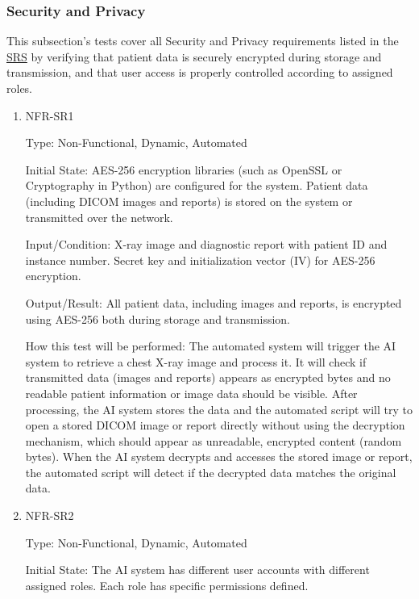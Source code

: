 \documentclass[12pt, titlepage]{article}
\begin{document}
\subsubsection{Security and Privacy}

This subsection's tests cover all Security and Privacy requirements listed in the \href{https://github.com/RezaJodeiri/CXR-Capstone/blob/main/docs/SRS/SRS.pdf}{SRS} \citep{SRS}
 by verifying that patient data is securely encrypted during storage and transmission, and that user access is properly controlled according to assigned roles.

\begin{enumerate}

\item{NFR-SR1\\}\label{NFR-SR1}

Type: Non-Functional, Dynamic, Automated

Initial State: AES-256 encryption libraries (such as OpenSSL or Cryptography in Python) are configured for the system. Patient data (including DICOM images and reports) is stored on the system or transmitted over the network.

Input/Condition: X-ray image and diagnostic report with patient ID and instance number. Secret key and initialization vector (IV) for AES-256 encryption.

Output/Result: All patient data, including images and reports, is encrypted using AES-256 both during storage and transmission.

How this test will be performed: The automated system will trigger the AI system to retrieve a chest X-ray image and process it. It will check if transmitted data (images and reports) appears as encrypted bytes and no readable patient information or image data should be visible. After processing, the AI system stores the data and the automated script will try to open a stored DICOM image or report directly without using the decryption mechanism, which should appear as unreadable, encrypted content (random bytes). When the AI system decrypts and accesses the stored image or report, the automated script will detect if the decrypted data matches the original data.

\item{NFR-SR2\\}\label{NFR-SR2}

Type: Non-Functional, Dynamic, Automated

Initial State: The AI system has different user accounts with different assigned roles. Each role has specific permissions defined.


\end{enumerate}
\end{document}
